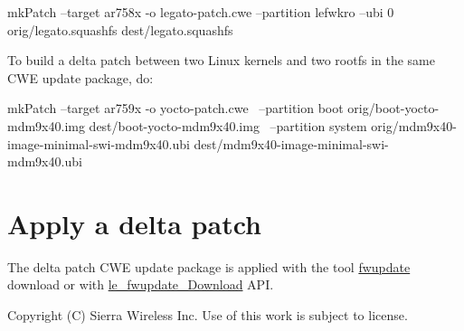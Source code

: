 \begin{DoxyVerb}mkPatch --target ar758x -o legato-patch.cwe --partition lefwkro --ubi 0 orig/legato.squashfs dest/legato.squashfs\end{DoxyVerb}


To build a delta patch between two Linux kernels and two rootfs in the same C\+WE update package, do\+: \begin{DoxyVerb}mkPatch --target ar759x -o yocto-patch.cwe \
          --partition boot orig/boot-yocto-mdm9x40.img dest/boot-yocto-mdm9x40.img \
          --partition system orig/mdm9x40-image-minimal-swi-mdm9x40.ubi dest/mdm9x40-image-minimal-swi-mdm9x40.ubi\end{DoxyVerb}
\hypertarget{Delta_Patch_ApplyDeltaPatch}{}\section{Apply a delta patch}\label{Delta_Patch_ApplyDeltaPatch}
The delta patch C\+WE update package is applied with the tool \hyperlink{toolsTarget_fwUpdate}{fwupdate} download or with \hyperlink{le__fwupdate__interface_8h_ab68f3a7c5d4284306468e888bf6a8796}{le\+\_\+fwupdate\+\_\+\+Download} A\+PI.





Copyright (C) Sierra Wireless Inc. Use of this work is subject to license. 